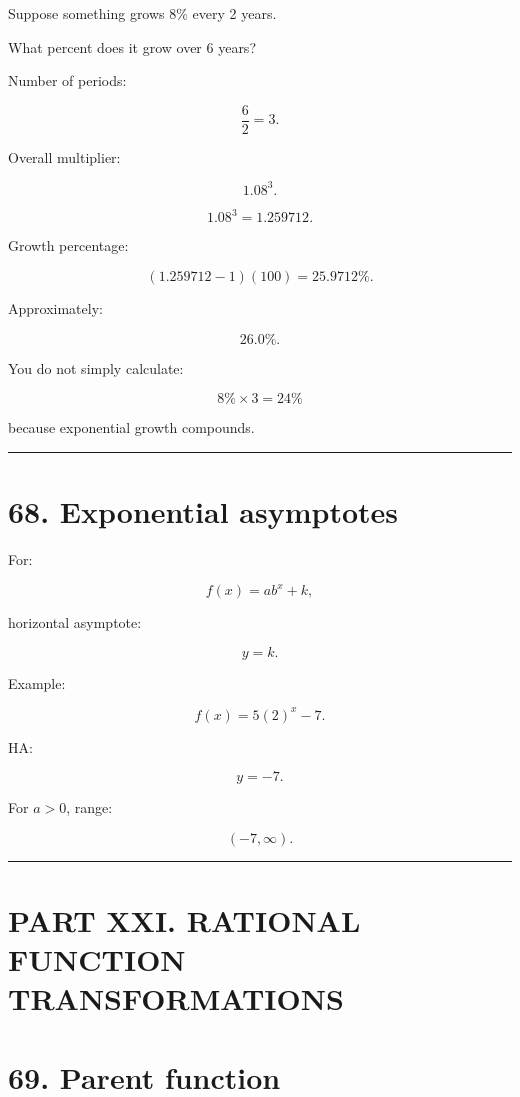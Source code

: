 \documentclass[
]{article}
\begin{document}
Suppose something grows \(8\%\) every 2 years.

What percent does it grow over 6 years?

Number of periods:

\[
\frac62=3.
\]

Overall multiplier:

\[
1.08^3.
\]

\[
1.08^3=1.259712.
\]

Growth percentage:

\[
(1.259712-1)(100)
=
25.9712\%.
\]

Approximately:

\[
\boxed{26.0\%}.
\]

You do not simply calculate:

\[
8\%\times3=24\%
\]

because exponential growth compounds.

\begin{center}\rule{0.5\linewidth}{0.5pt}\end{center}

\section{68. Exponential asymptotes}\label{exponential-asymptotes}

For:

\[
f(x)=ab^x+k,
\]

horizontal asymptote:

\[
\boxed{y=k}.
\]

Example:

\[
f(x)=5(2)^x-7.
\]

HA:

\[
\boxed{y=-7}.
\]

For \(a>0\), range:

\[
\boxed{(-7,\infty)}.
\]

\begin{center}\rule{0.5\linewidth}{0.5pt}\end{center}

\section{PART XXI. RATIONAL FUNCTION
TRANSFORMATIONS}\label{part-xxi.-rational-function-transformations}

\section{69. Parent function}\label{parent-function}
\end{document}
